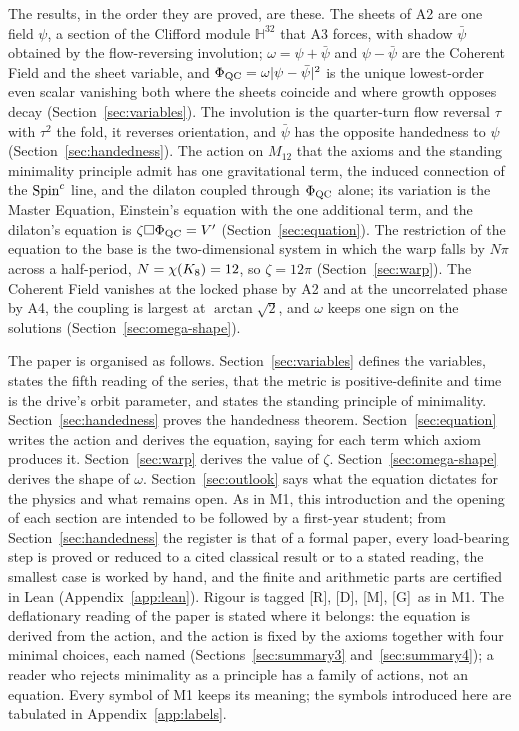\documentclass[11pt,a4paper]{article}
\theoremstyle{plain}
\theoremstyle{definition}
\theoremstyle{remark}
\newcommand{\Hquat}{\mathbb{H}}
\newcommand{\rigR}{[\textup{R}]}
\newcommand{\rigD}{[\textup{D}]}
\newcommand{\rigM}{[\textup{M}]}
\newcommand{\rigG}{[\textup{G}]}
\begin{document}
The results, in the order they are proved, are these. The sheets of A2 are one field $\psi$, a section of the Clifford module $\Hquat^{32}$ that A3 forces, with shadow $\bar\psi$ obtained by the flow-reversing involution; $\omega=\psi+\bar\psi$ and $\psi-\bar\psi$ are the Coherent Field and the sheet variable, and $\Phi_{\mathrm{QC}}=\omega\lvert\psi-\bar\psi\rvert^{2}$ is the unique lowest-order even scalar vanishing both where the sheets coincide and where growth opposes decay (Section~\ref{sec:variables}). The involution is the quarter-turn flow reversal $\tau$ with $\tau^{2}$ the fold, it reverses orientation, and $\bar\psi$ has the opposite handedness to $\psi$ (Section~\ref{sec:handedness}). The action on $M_{12}$ that the axioms and the standing minimality principle admit has one gravitational term, the induced connection of the $\text{Spin}^c$ line, and the dilaton coupled through $\Phi_{\mathrm{QC}}$ alone; its variation is the Master Equation, Einstein's equation with the one additional term, and the dilaton's equation is $\zeta\Box\Phi_{\mathrm{QC}}=V'$ (Section~\ref{sec:equation}). The restriction of the equation to the base is the two-dimensional system in which the warp falls by $N\pi$ across a half-period, $N=\chi(K_8)=12$, so $\zeta=12\pi$ (Section~\ref{sec:warp}). The Coherent Field vanishes at the locked phase by A2 and at the uncorrelated phase by A4, the coupling is largest at $\arctan\sqrt2$, and $\omega$ keeps one sign on the solutions (Section~\ref{sec:omega-shape}).

The paper is organised as follows. Section~\ref{sec:variables} defines the variables, states the fifth reading of the series, that the metric is positive-definite and time is the drive's orbit parameter, and states the standing principle of minimality. Section~\ref{sec:handedness} proves the handedness theorem. Section~\ref{sec:equation} writes the action and derives the equation, saying for each term which axiom produces it. Section~\ref{sec:warp} derives the value of $\zeta$. Section~\ref{sec:omega-shape} derives the shape of $\omega$. Section~\ref{sec:outlook} says what the equation dictates for the physics and what remains open. As in M1, this introduction and the opening of each section are intended to be followed by a first-year student; from Section~\ref{sec:handedness} the register is that of a formal paper, every load-bearing step is proved or reduced to a cited classical result or to a stated reading, the smallest case is worked by hand, and the finite and arithmetic parts are certified in Lean (Appendix~\ref{app:lean}). Rigour is tagged \rigR, \rigD, \rigM, \rigG\ as in M1. The deflationary reading of the paper is stated where it belongs: the equation is derived from the action, and the action is fixed by the axioms together with four minimal choices, each named (Sections~\ref{sec:summary3} and~\ref{sec:summary4}); a reader who rejects minimality as a principle has a family of actions, not an equation. Every symbol of M1 keeps its meaning; the symbols introduced here are tabulated in Appendix~\ref{app:labels}.
\end{document}

